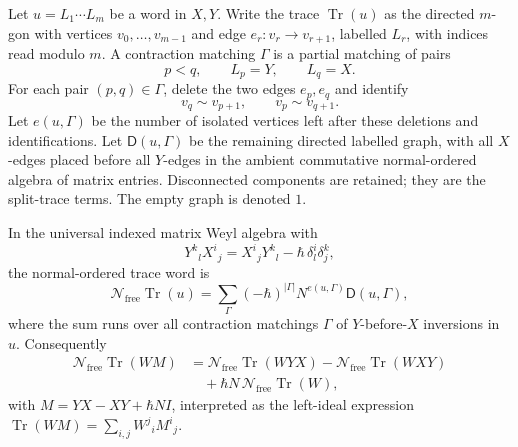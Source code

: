 \begin{defn}
\label{def:app-free-indexed-normal-diagrams}
  Let \(u=L_1\cdots L_m\) be a word in \(X,Y\).  Write the trace
  \(\operatorname{Tr}(u)\) as the directed \(m\)-gon with vertices
  \(v_0,\ldots,v_{m-1}\) and edge \(e_r:v_r\to v_{r+1}\), labelled
  \(L_r\), with indices read modulo \(m\).  A contraction matching
  \(\Gamma\) is a partial matching of pairs
  \[
    p<q,\qquad L_p=Y,\qquad L_q=X .
  \]
  For each pair \((p,q)\in\Gamma\), delete the two edges \(e_p,e_q\)
  and identify
  \[
    v_q\sim v_{p+1},\qquad v_p\sim v_{q+1}.
  \]
  Let \(e(u,\Gamma)\) be the number of isolated vertices left after
  these deletions and identifications.  Let
  \(\mathsf D(u,\Gamma)\) be the remaining directed labelled graph,
  with all \(X\)-edges placed before all \(Y\)-edges in the ambient
  commutative normal-ordered algebra of matrix entries.  Disconnected
  components are retained; they are the split-trace terms.  The empty
  graph is denoted \(1\).
\end{defn}

\begin{thm}
\label{thm:app-free-indexed-normal-ordering}
  In the universal indexed matrix Weyl algebra with
  \[
    Y^k{}_lX^i{}_j=X^i{}_jY^k{}_l-\hbar\,\delta^i_l\delta^k_j,
  \]
  the normal-ordered trace word is
  \[
    \mathcal N_{\mathrm{free}}\operatorname{Tr}(u)
    =
    \sum_{\Gamma}
      (-\hbar)^{|\Gamma|}
      N^{e(u,\Gamma)}
      \mathsf D(u,\Gamma),
  \]
  where the sum runs over all contraction matchings
  \(\Gamma\) of \(Y\)-before-\(X\) inversions in \(u\).  Consequently
  \[
  \begin{aligned}
    \mathcal N_{\mathrm{free}}\operatorname{Tr}(W M)
    &=
      \mathcal N_{\mathrm{free}}\operatorname{Tr}(WYX)
      -\mathcal N_{\mathrm{free}}\operatorname{Tr}(WXY)\\
    &\quad
      +\hbar N\,\mathcal N_{\mathrm{free}}\operatorname{Tr}(W),
  \end{aligned}
  \]
  with \(M=YX-XY+\hbar N I\), interpreted as the left-ideal expression
  \(\operatorname{Tr}(W M)=\sum_{i,j}W^j{}_iM^i{}_j\).
\end{thm}


